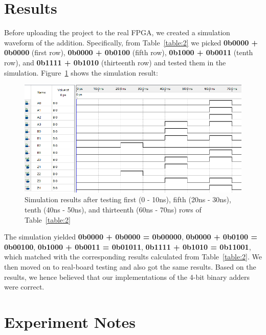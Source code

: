 \documentclass[12pt]{article}
\begin{document}
\section{Results}

Before uploading the project to the real FPGA, we created a simulation waveform of the addition. Specifically, from Table~\ref{table:2} we picked \textbf{0b0000 + 0b0000} (first row), \textbf{0b0000 + 0b0100} (fifth row), \textbf{0b1000 + 0b0011} (tenth row), and \textbf{0b1111 + 0b1010} (thirteenth row) and tested them in the simulation. Figure~\ref{figure:4} shows the simulation result:

\begin{figure}[h]
    \centering
    \includegraphics[width=\textwidth]{simulation.png}
    \caption{Simulation results after testing first (0 - 10ns), fifth (20ns - 30ns), tenth (40ns - 50ns), and thirteenth (60ns - 70ns) rows of Table~\ref{table:2}}
    \label{figure:4}
\end{figure}

The simulation yielded \textbf{0b0000 + 0b0000 = 0b00000}, \textbf{0b0000 + 0b0100 = 0b00100}, \textbf{0b1000 + 0b0011 = 0b01011}, \textbf{0b1111 + 0b1010 = 0b11001}, which matched with the corresponding results calculated from Table~\ref{table:2}. We then moved on to real-board testing and also got the same results. Based on the results, we hence believed that our implementations of the 4-bit binary adders were correct.

\section{Experiment Notes}
\end{document}
